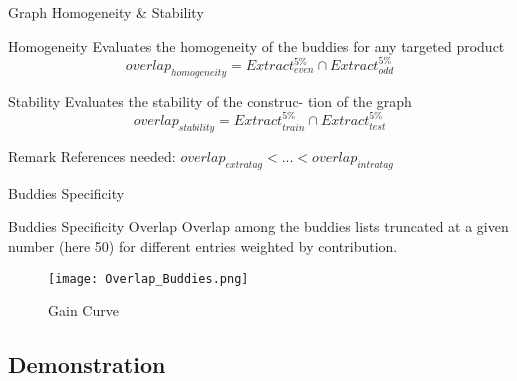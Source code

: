 \documentclass[pdf]{beamer}
\begin{document}
\begin{frame}{Graph Homogeneity \& Stability}
\begin{block}{Homogeneity}
Evaluates the homogeneity of the buddies for any targeted product
	\begin{equation*}
	overlap_{homogeneity} = Extract_{even}^{5\%} \cap Extract_{odd}^{5\%}
	\end{equation*}
\end{block}
\begin{block}{Stability}
Evaluates the stability of the construc- tion of the graph
	\begin{equation*}
	overlap_{stability} = Extract_{train}^{5\%} \cap Extract_{test}^{5\%}
	\end{equation*}
\end{block}
\begin{alertblock}{Remark}
References needed:
$ overlap_{extratag} < ... < overlap_{intratag} $
\end{alertblock}
\end{frame}

\begin{frame}{Buddies Specificity}
\begin{block}{Buddies Specificity Overlap}
Overlap among the buddies lists truncated at a given number (here 50) for different entries weighted by contribution.
\end{block}
			\begin{figure}
	    	     \texttt{[image: Overlap\_Buddies.png]}
    	     \caption{Gain Curve}		
			\end{figure}
\end{frame}

\subsection{Demonstration}
\end{document}
